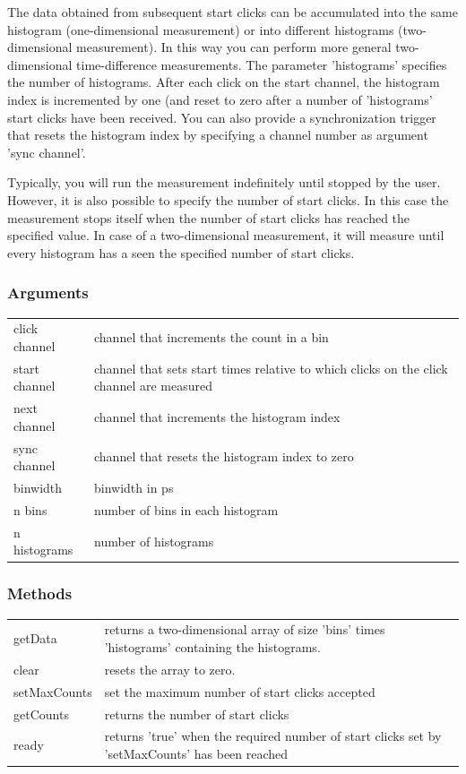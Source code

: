 \documentclass[oneside]{memoir}
\begin{document}
The data obtained from subsequent start clicks can be accumulated into the same histogram (one-dimensional measurement)
or into different histograms (two-dimensional measurement). In this way you can perform more general two-dimensional
time-difference measurements. The parameter 'histograms' specifies the number of histograms. After each click
on the start channel, the histogram index is incremented by one (and reset to zero after a number of 'histograms'
start clicks have been received. You can also provide a synchronization trigger that resets the histogram index by
specifying a channel number as argument 'sync channel'.

Typically, you will run the measurement indefinitely until stopped by the user. However, it is also possible to
specify the number of start clicks. In this case the measurement stops itself when the number of start clicks
has reached the specified value. In case of a two-dimensional measurement, it will measure until every histogram
has a seen the specified number of start clicks.

\subsubsection{Arguments}
\begin{tabular}{p{}p{}}
  click channel & channel that increments the count in a bin\\
  start channel & channel that sets start times relative to which clicks on the click channel are measured\\
  next channel & channel that increments the histogram index\\
  sync channel & channel that resets the histogram index to zero\\
  binwidth & binwidth in ps\\
  n bins & number of bins in each histogram\\
  n histograms & number of histograms\\
\end{tabular}
\subsubsection{Methods}
\begin{tabular}{p{}p{}}
  getData & returns a two-dimensional array of size 'bins' times 'histograms' containing the histograms.\\
  clear & resets the array to zero.\\
  setMaxCounts & set the maximum number of start clicks accepted\\
  getCounts & returns the number of start clicks\\
  ready & returns 'true' when the required number of start clicks set by 'setMaxCounts' has been reached\\
\end{tabular}
\end{document}
